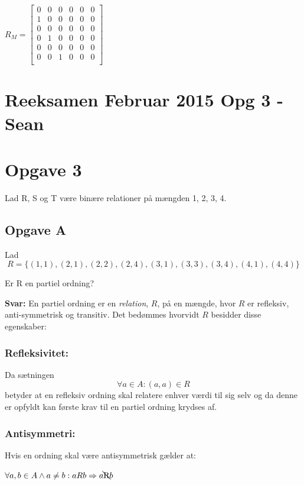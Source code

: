 \documentclass{article}
\begin{document}
\begin{center}
\begin{math}
R_M = \begin{bmatrix}
0 & 0 & 0 & 0 & 0 & 0\\
1 & 0 & 0 & 0 & 0 & 0\\
0 & 0 & 0 & 0 & 0 & 0\\
0 & 1 & 0 & 0 & 0 & 0\\
0 & 0 & 0 & 0 & 0 & 0\\
0 & 0 & 1 & 0 & 0 & 0\\

\end{bmatrix}
\end{math}
\end{center}









\section{Reeksamen Februar 2015 Opg 3 - Sean}
\section{Opgave 3}
Lad R, S og T være binære relationer på mængden {1, 2, 3, 4}.


\subsection{Opgave A}
Lad \[R = \{(1, 1),(2, 1),(2, 2),(2, 4),(3, 1),(3, 3),(3, 4),(4, 1),(4, 4)\}\]

Er R en partiel ordning?

\textbf{Svar:}
{En partiel ordning er en \emph{relation}, $R$, på en mængde,  hvor $R$ er refleksiv, anti-symmetrisk og transitiv. Det bedømmes hvorvidt $R$ besidder disse egenskaber:}


\subsubsection{Refleksivitet:}
Da sætningen \[\forall a \in A : (a,a) \in R\] betyder at en refleksiv ordning skal relatere enhver værdi til sig selv og da denne er opfyldt kan første krav til en partiel ordning krydses af.


\subsubsection{Antisymmetri:}
Hvis en ordning skal være antisymmetrisk gælder at:\par
\begin{center}
\begin{math}
\forall a,b \in A \land a \neq b: aRb \Rightarrow a  $\bcancel{R}$ b
\end{math}
\end{center}
\end{document}
